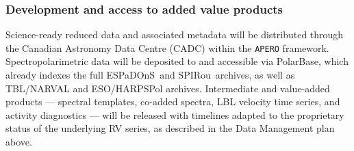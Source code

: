 \documentclass[
    traditabstract,
    longauth,
    onecolumn,
]{aa}
\def \spi{SPIRou}
\def \esp{ESPaDOnS}
\begin{document}


\subsubsection{Development and access to added value products}

Science-ready reduced data and associated metadata will be distributed through the Canadian Astronomy Data Centre (CADC) within the \texttt{APERO} framework. Spectropolarimetric data will be deposited to and accessible via PolarBase, which already indexes the full \esp\ and \spi\ archives, as well as TBL/NARVAL and ESO/HARPSPol archives. Intermediate and value-added products --- spectral templates, co-added spectra, LBL velocity time series, and activity diagnostics --- will be released with timelines adapted to the proprietary status of the underlying RV series, as described in the Data Management plan above.


\newpage

 

\end{document}
